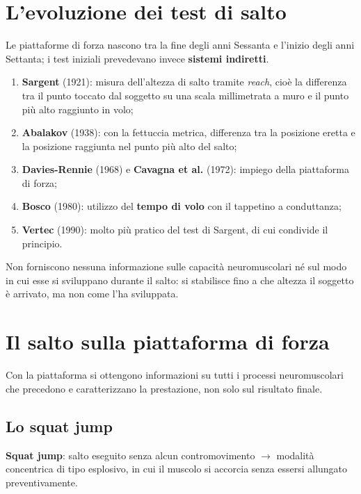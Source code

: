\section{L'evoluzione dei test di salto}

Le piattaforme di forza nascono tra la fine degli anni Sessanta e l'inizio degli anni Settanta; i
test iniziali prevedevano invece \textbf{sistemi indiretti}.

\begin{enumerate}
  \item \textbf{Sargent} (1921): misura dell'altezza di salto tramite \textit{reach}, cioè la
    differenza tra il punto toccato dal soggetto su una scala millimetrata a muro e il punto più
    alto raggiunto in volo;
  \item \textbf{Abalakov} (1938): con la fettuccia metrica, differenza tra la posizione eretta e la
    posizione raggiunta nel punto più alto del salto;
  \item \textbf{Davies-Rennie} (1968) e \textbf{Cavagna et al.} (1972): impiego della piattaforma
    di forza;
  \item \textbf{Bosco} (1980): utilizzo del \textbf{tempo di volo} con il tappetino a conduttanza;
  \item \textbf{Vertec} (1990): molto più pratico del test di Sargent, di cui condivide il
    principio.
\end{enumerate}

Non forniscono nessuna informazione sulle capacità neuromuscolari né sul modo in cui esse
si sviluppano durante il salto: si stabilisce fino a che altezza il soggetto è arrivato, ma non
come l'ha sviluppata.

\section{Il salto sulla piattaforma di forza}

Con la piattaforma si ottengono informazioni su tutti i processi neuromuscolari che precedono e
  caratterizzano la prestazione, non solo sul risultato finale.

\subsection{Lo squat jump}

\textbf{Squat jump}: salto eseguito senza alcun contromovimento $\rightarrow$ modalità concentrica
  di tipo esplosivo, in cui il muscolo si accorcia senza essersi allungato preventivamente.

